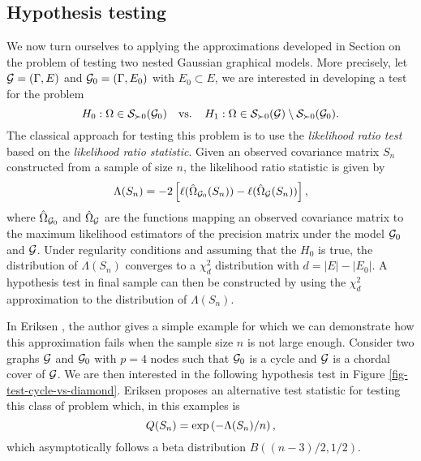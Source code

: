 \subsection{Hypothesis testing}


We now turn ourselves to applying the approximations developed in Section  on the problem of testing two nested Gaussian graphical models. More precisely, let ${\mathcal{G}} = (\Gamma, E)$ and ${\mathcal{G}}_0 = (\Gamma, E_0)$ with $E_0 \subset E$, we are interested in developing a test for the problem
\begin{equation} \label{eq-null-general-graph}
    H_0 : \Omega \in {\mathcal{S}}_{\succ 0}({\mathcal{G}}_0)\ \ {\textrm{ vs. }}\ \ H_1 : \Omega \in {\mathcal{S}}_{\succ 0}({\mathcal{G}}) \setminus {\mathcal{S}}_{\succ 0}({\mathcal{G}}_0).
\end{equation}
The classical approach for testing this problem is to use the \textit{likelihood ratio test} based on the \textit{likelihood ratio statistic}. Given an observed covariance matrix $S_n$ constructed from a sample of size $n$, the likelihood ratio statistic is given by
\begin{equation*}
    \Lambda(S_n) = -2 \left[\ell(\hat\Omega_{{\mathcal{G}}_0}(S_n)) - \ell(\hat\Omega_{\mathcal{G}}(S_n))\right],
\end{equation*}
where $\hat\Omega_{{\mathcal{G}}_0}$ and $\hat\Omega_{\mathcal{G}}$ are the functions mapping an observed covariance matrix to the maximum likelihood estimators of the precision matrix under the model ${\mathcal{G}}_0$ and ${\mathcal{G}}$. Under regularity conditions and assuming that the $H_0$ is true, the distribution of $\Lambda(S_n)$ converges to a $\chi^2_d$ distribution with $d = |E| - |E_0|$. A hypothesis test in final sample can then be constructed by using the $\chi^2_d$ approximation to the distribution of $\Lambda(S_n)$.

In Eriksen \cite{eriksen1996tests}, the author gives a simple example for which we can demonstrate how this approximation fails when the sample size $n$ is not large enough. Consider two graphs ${\mathcal{G}}$ and ${\mathcal{G}}_0$ with $p = 4$ nodes such that ${\mathcal{G}}_0$ is a cycle and ${\mathcal{G}}$ is a chordal cover of ${\mathcal{G}}$. We are then interested in the following hypothesis test in Figure \ref{fig-test-cycle-vs-diamond}. Eriksen proposes an alternative test statistic for testing this class of problem which, in this examples is
\begin{equation} \label{eq-q-stat}
    Q(S_n) = \exp\left(-\Lambda(S_n) / n\right),
\end{equation}
which asymptotically follows a beta distribution $B((n - 3)/2, 1/2)$.



